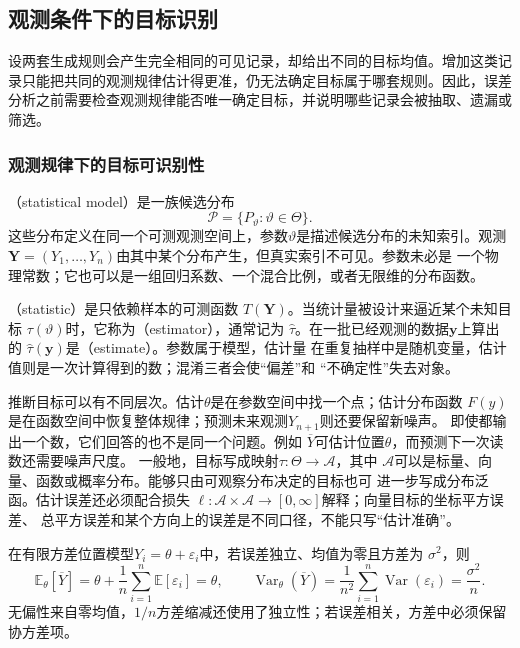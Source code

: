 \subsection{观测条件下的目标识别}
\label{sec:stats-targets-data-sources}
设两套生成规则会产生完全相同的可见记录，却给出不同的目标均值。增加这类记录只能把共同的观测规律估计得更准，仍无法确定目标属于哪套规则。因此，误差分析之前需要检查观测规律能否唯一确定目标，并说明哪些记录会被抽取、遗漏或筛选。

\subsubsection{观测规律下的目标可识别性}
\label{sec:statistics-model-target}
\begin{definition}[统计模型与统计量]
  \label{def:statistics-model-statistic}
（statistical model）是一族候选分布
\[
  \mathcal{P}=\{P_\vartheta:\vartheta\in\Theta\}.
\]
这些分布定义在同一个可测观测空间上，参数\(\vartheta\)是描述候选分布的未知索引。观测
\(\bm{Y}=(Y_1,\ldots,Y_n)\)由其中某个分布产生，但真实索引不可见。参数未必是
一个物理常数；它也可以是一组回归系数、一个混合比例，或者无限维的分布函数。

（statistic）是只依赖样本的可测函数
\(T(\bm{Y})\)。当统计量被设计来逼近某个未知目标
\(\tau(\vartheta)\)时，它称为（estimator），通常记为
\(\widehat{\tau}\)。在一批已经观测的数据\(\bm{y}\)上算出的
\(\widehat{\tau}(\bm{y})\)是（estimate）。参数属于模型，估计量
在重复抽样中是随机变量，估计值则是一次计算得到的数；混淆三者会使“偏差”和
“不确定性”失去对象。
\end{definition}

推断目标可以有不同层次。估计\(\theta\)是在参数空间中找一个点；估计分布函数
\(F(y)\)是在函数空间中恢复整体规律；预测未来观测\(Y_{n+1}\)则还要保留新噪声。
即使都输出一个数，它们回答的也不是同一个问题。例如
\(\overline{Y}\)可估计位置\(\theta\)，而预测下一次读数还需要噪声尺度。
一般地，目标写成映射\(\tau:\Theta\to\mathcal A\)，其中
\(\mathcal A\)可以是标量、向量、函数或概率分布。能够只由可观察分布决定的目标也可
进一步写成分布泛函。估计误差还必须配合损失
\(\ell:\mathcal A\times\mathcal A\to[0,\infty]\)解释；向量目标的坐标平方误差、
总平方误差和某个方向上的误差是不同口径，不能只写“估计准确”。

在有限方差位置模型\(Y_i=\theta+\varepsilon_i\)中，若误差独立、均值为零且方差为
\(\sigma^2\)，则
\[
  \mathbb{E}_\theta[\overline Y]
  =\theta+\frac1n\sum_{i=1}^n\mathbb{E}[\varepsilon_i]
  =\theta,\qquad
  \operatorname{Var}_\theta(\overline Y)
  =\frac1{n^2}\sum_{i=1}^n\operatorname{Var}(\varepsilon_i)
  =\frac{\sigma^2}{n}.
\]
无偏性来自零均值，\(1/n\)方差缩减还使用了独立性；若误差相关，方差中必须保留
协方差项。

